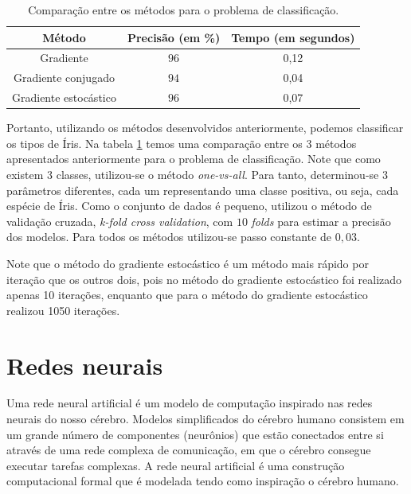 \documentclass[
	12pt,				%
    oneside,			%
	a4paper,			%
	english,			%
	french,				%
	spanish,			%
	brazil,				%
	]{abntex2}
\begin{document}
            \begin{table}[htb]
                \centering
                \caption{Comparação entre os métodos para o problema de classificação.}
                \label{tab:class}
                \begin{tabular}{@{}ccc@{}}
                \toprule
                \textbf{Método}       & \textbf{Precisão (em \%)} & \textbf{Tempo (em segundos)} \\ \midrule
                Gradiente             & $96$        & 0,12             \\
                Gradiente conjugado   & $94$        & 0,04              \\
                Gradiente estocástico & $96$        & 0,07               \\ \bottomrule
                \end{tabular}
            \end{table}


            Portanto, utilizando os métodos desenvolvidos anteriormente, podemos classificar os tipos de Íris. Na tabela \ref{tab:class} temos uma comparação entre os 3 métodos apresentados anteriormente para o problema de classificação. Note que como existem 3 classes, utilizou-se o método \emph{one-vs-all}. Para tanto, determinou-se 3 parâmetros diferentes, cada um representando uma classe positiva, ou seja, cada espécie de Íris. Como o conjunto de dados é pequeno, utilizou o método de validação cruzada, \emph{k-fold cross validation}, com $10$ \emph{folds} para estimar a precisão dos modelos. Para todos os métodos utilizou-se passo constante de $0,03$.

            Note que o método do gradiente estocástico é um método mais rápido por iteração que os outros dois, pois no método do gradiente estocástico foi realizado apenas 10 iterações, enquanto que para o método do gradiente estocástico realizou 1050 iterações.

    \section{Redes neurais}
        Uma rede neural artificial é um modelo de computação inspirado nas redes neurais do nosso cérebro. Modelos simplificados do cérebro humano consistem em um grande número de componentes (neurônios) que estão conectados entre si através de uma rede complexa de comunicação, em que o cérebro consegue executar tarefas complexas. A rede neural artificial é uma construção computacional formal que é modelada tendo como inspiração o cérebro humano.
\end{document}
